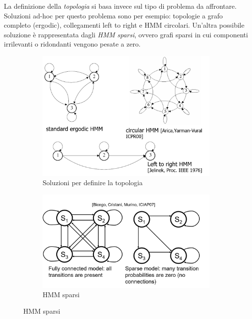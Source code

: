 \documentclass[a4paper,oneside,titlepage]{book}
\begin{document}
\noindent
La definizione della \textit{topologia} si basa invece sul tipo di problema da affrontare. Soluzioni ad-hoc per questo problema sono per esempio: topologie a grafo completo (ergodic), collegamenti left to right e HMM circolari. Un'altra possibile soluzione è rappresentata dagli \textit{HMM sparsi}, ovvero grafi sparsi in cui componenti irrilevanti o ridondanti vengono pesate a zero.
\begin{figure}[htp]
	\begin{subfigure}{0.49\textwidth}
	    \centering
		\includegraphics[width=\textwidth, height=\textheight, keepaspectratio]{hmm8.png}
		\caption{Soluzioni per definire la topologia}
	\end{subfigure}
	\hfill
	\begin{subfigure}{0.49\textwidth}
	    \centering
		\includegraphics[width=\textwidth, height=\textheight, keepaspectratio]{hmm9.png}
		\caption{HMM sparsi}
	\end{subfigure}
\end{figure}
\end{document}
